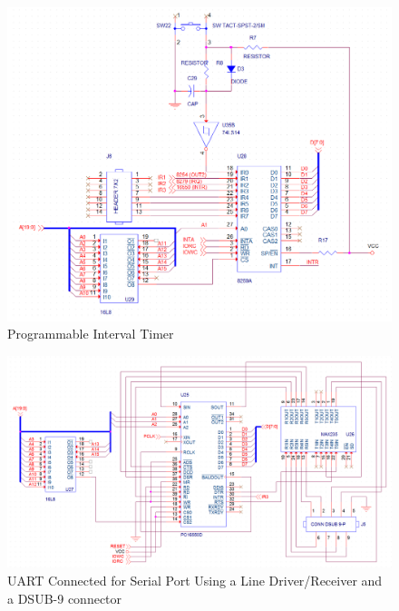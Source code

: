 \begin{appendices}
        \begin{figure}[ht]
            \begin{center}
                \includegraphics[width=1\textwidth]{figures/schematics/pic.png}
                \caption{Programmable Interval Timer} \label{fig:page7}
            \end{center}
        \end{figure}

        \begin{figure}[ht]
            \begin{center}
                \includegraphics[width=1\textwidth]{figures/schematics/uart.png}
                \caption{UART Connected for Serial Port Using a Line Driver/Receiver and a DSUB-9 connector} \label{fig:page8}
            \end{center}
        \end{figure}


\end{appendices}
